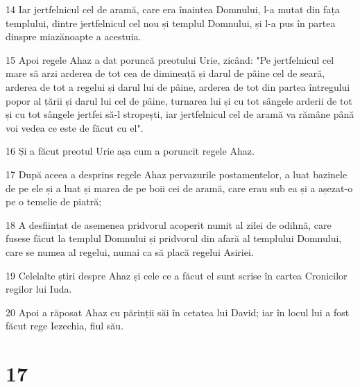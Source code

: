 \par 14 Iar jertfelnicul cel de aramă, care era înaintea Domnului, l-a mutat din fața templului, dintre jertfelnicul cel nou și templul Domnului, și l-a pus în partea dinspre miazănoapte a acestuia.
\par 15 Apoi regele Ahaz a dat poruncă preotului Urie, zicând: "Pe jertfelnicul cel mare să arzi arderea de tot cea de dimineață și darul de pâine cel de seară, arderea de tot a regelui și darul lui de pâine, arderea de tot din partea întregului popor al țării și darul lui cel de pâine, turnarea lui și cu tot sângele arderii de tot și cu tot sângele jertfei să-l stropești, iar jertfelnicul cel de aramă va rămâne până voi vedea ce este de făcut cu el".
\par 16 Și a făcut preotul Urie așa cum a poruncit regele Ahaz.
\par 17 După aceea a desprins regele Ahaz pervazurile postamentelor, a luat bazinele de pe ele și a luat și marea de pe boii cei de aramă, care erau sub ea și a așezat-o pe o temelie de piatră;
\par 18 A desființat de asemenea pridvorul acoperit numit al zilei de odihnă, care fusese făcut la templul Domnului și pridvorul din afară al templului Domnului, care se numea al regelui, numai ca să placă regelui Asiriei.
\par 19 Celelalte știri despre Ahaz și cele ce a făcut el sunt scrise în cartea Cronicilor regilor lui Iuda.
\par 20 Apoi a răposat Ahaz cu părinții săi în cetatea lui David; iar în locul lui a fost făcut rege Iezechia, fiul său.

\chapter{17}

